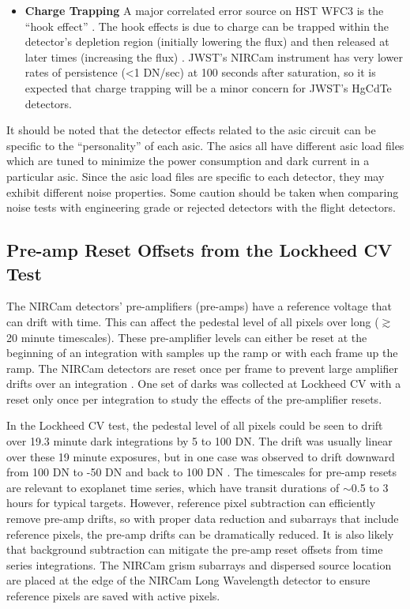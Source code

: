 \documentclass{aastex62}
\begin{document}
\begin{itemize}[noitemsep]
	\item \textbf{Charge Trapping} A major correlated error source on HST WFC3 is the ``hook effect'' \citep{berta2012flat_gj1214}.
	The hook effects is due to charge can be trapped within the detector's depletion region (initially lowering the flux) and then released at later times (increasing the flux) \citep{zhou2017chargeTrap}.
	JWST's NIRCam instrument has very lower rates of persistence (<1 DN/sec) at 100 seconds after saturation, so it is expected that charge trapping will be a minor concern for JWST's HgCdTe detectors.
\end{itemize}

It should be noted that the detector effects related to the asic circuit can be specific to the ``personality'' of each asic. The asics all have different asic load files which are tuned to minimize the power consumption and dark current in a particular asic. Since the asic load files are specific to each detector, they may exhibit different noise properties.
Some caution should be taken when comparing noise tests with engineering grade or rejected detectors with the flight detectors.

\subsection{Pre-amp Reset Offsets from the Lockheed CV Test}\label{sec:preAmp}

The NIRCam detectors' pre-amplifiers (pre-amps) have a reference voltage that can drift with time.
This can affect the pedestal level of all pixels over long ($\gtrsim$ 20 minute timescales).
These pre-amplifier levels can either be reset at the beginning of an integration with samples up the ramp or with each frame up the ramp.
The NIRCam detectors are reset once per frame to prevent large amplifier drifts over an integration \citep{robberto2014refPixPreAmp}.
One set of darks was collected at Lockheed CV with a reset only once per integration to study the effects of the pre-amplifier resets.

In the Lockheed CV test, the pedestal level of all pixels could be seen to drift over 19.3 minute dark integrations by 5 to 100 DN.
The drift was usually linear over these 19 minute exposures, but in one case was observed to drift downward from 100 DN to -50 DN and back to 100 DN \citep{robberto2014refPixPreAmp}.
The timescales for pre-amp resets are relevant to exoplanet time series, which have transit durations of $\sim$0.5 to 3 hours for typical targets.
However, reference pixel subtraction can efficiently remove pre-amp drifts, so with proper data reduction and subarrays that include reference pixels, the pre-amp drifts can be dramatically reduced.
It is also likely that background subtraction can mitigate the pre-amp reset offsets from time series integrations.
The NIRCam grism subarrays and dispersed source location are placed at the edge of the NIRCam Long Wavelength detector to ensure reference pixels are saved with active pixels.
\end{document}
